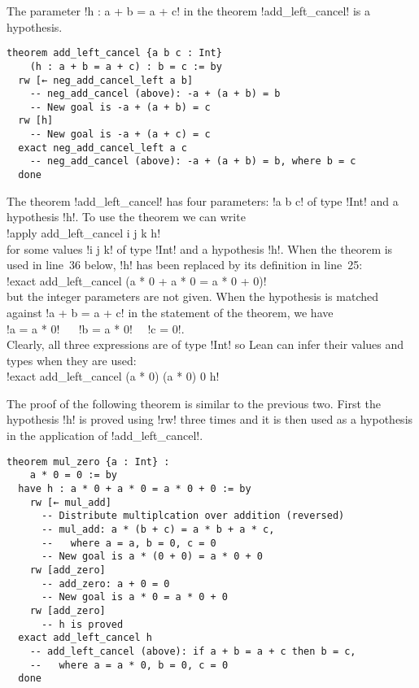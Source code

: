 
The parameter !h : a + b = a + c! in the theorem !add_left_cancel! is a hypothesis.
\begin{Verbatim}[firstnumber=last]
theorem add_left_cancel {a b c : Int}
    (h : a + b = a + c) : b = c := by
  rw [← neg_add_cancel_left a b]
    -- neg_add_cancel (above): -a + (a + b) = b
    -- New goal is -a + (a + b) = c
  rw [h]
    -- New goal is -a + (a + c) = c
  exact neg_add_cancel_left a c
    -- neg_add_cancel (above): -a + (a + b) = b, where b = c
  done
\end{Verbatim}

The theorem !add_left_cancel! has four parameters: !a b c! of type !Int! and a hypothesis !h!. To use the theorem we can write\\
\indnt{}!apply add_left_cancel i j k h!\\
for some values !i j k! of type !Int! and a hypothesis !h!. When the theorem is used in line~36 below, !h! has been replaced by its definition in line~25:\\
\indnt{}!exact add_left_cancel (a * 0 + a * 0 = a * 0 + 0)!\\
but the integer parameters are not given. When the hypothesis is matched against !a + b = a + c! in the statement of the theorem, we have\\
\indnt{}!a = a * 0! $\quad$ !b = a * 0!$\quad$   !c = 0!.\\
Clearly, all three expressions are of type !Int! so Lean can infer their values and types when they are used:\\
\indnt{}!exact add_left_cancel (a * 0) (a * 0) 0 h!


The proof of the following theorem is similar to the previous two. First the hypothesis !h! is proved using !rw! three times and it is then used as a hypothesis in the application of !add_left_cancel!.
\begin{Verbatim}[firstnumber=last]
theorem mul_zero {a : Int} :
    a * 0 = 0 := by
  have h : a * 0 + a * 0 = a * 0 + 0 := by
    rw [← mul_add]
      -- Distribute multiplcation over addition (reversed)
      -- mul_add: a * (b + c) = a * b + a * c,
      --   where a = a, b = 0, c = 0
      -- New goal is a * (0 + 0) = a * 0 + 0
    rw [add_zero]
      -- add_zero: a + 0 = 0
      -- New goal is a * 0 = a * 0 + 0
    rw [add_zero]
      -- h is proved
  exact add_left_cancel h
    -- add_left_cancel (above): if a + b = a + c then b = c,
    --   where a = a * 0, b = 0, c = 0
  done
\end{Verbatim}
